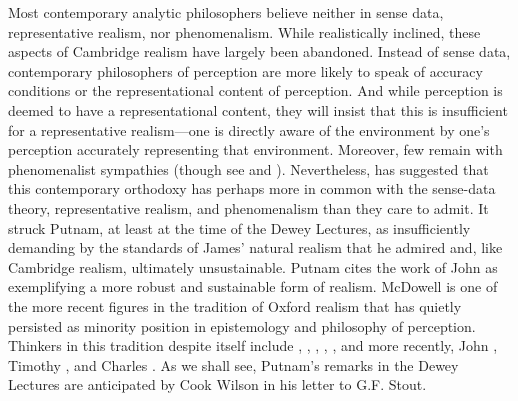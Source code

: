 \documentclass[12pt]{article}
\begin{document}
Most contemporary analytic philosophers believe neither in sense data, representative realism, nor phenomenalism. While realistically inclined, these aspects of Cambridge realism have largely been abandoned. Instead of sense data, contemporary philosophers of perception are more likely to speak of accuracy conditions or the representational content of perception. And while perception is deemed to have a representational content, they will insist that this is insufficient for a representative realism---one is directly aware of the environment by one's perception accurately representing that environment. Moreover, few remain with phenomenalist sympathies (though see \citealt{Foster:2000ny} and \citealt{Noe:2004fk}). Nevertheless, \citet{Putnam:1994kx} has suggested that this contemporary orthodoxy has perhaps more in common with the sense-data theory, representative realism, and phenomenalism than they care to admit. It struck Putnam, at least at the time of the Dewey Lectures, as insufficiently demanding by the standards of James' natural realism that he admired and, like Cambridge realism, ultimately unsustainable. Putnam cites the work of John \citet{McDowell:1994am} as exemplifying a more robust and sustainable form of realism. McDowell is one of the more recent figures in the tradition of Oxford realism that has quietly persisted as minority position in epistemology and philosophy of perception. Thinkers in this tradition despite itself include \citet{Cook-Wilson:1926sf}, \citet{Prichard:1950tg}, \citet{Ryle:1949qr}, \citet{Austin:1946ao,Austin:1962lr}, \citet{Hinton:1973js}, and more recently, John \citet{McDowell:1994am}, Timothy \citet{Williamson:2000lr}, and Charles \citet{Travis:2008la}. As we shall see, Putnam's remarks in the Dewey Lectures are anticipated by Cook Wilson in his letter to G.F. Stout.
\end{document}
